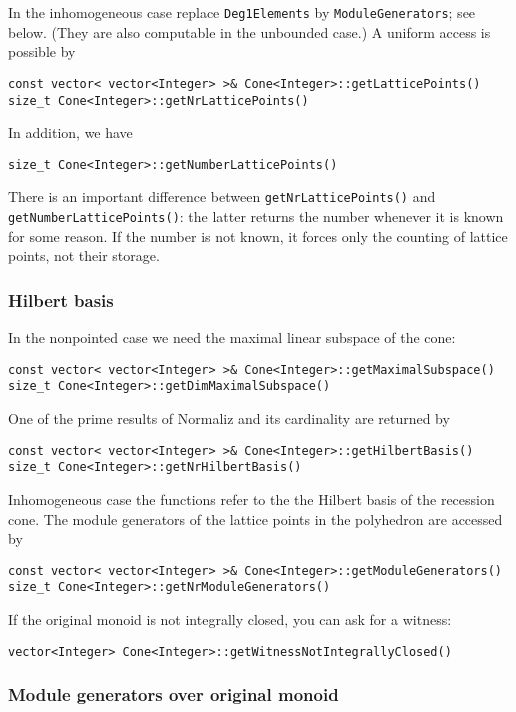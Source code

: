 \begin{small}
In the inhomogeneous case replace \verb|Deg1Elements| by \verb|ModuleGenerators|; see below. (They are also computable in the unbounded case.) A uniform access is possible by
\begin{Verbatim}
const vector< vector<Integer> >& Cone<Integer>::getLatticePoints()
size_t Cone<Integer>::getNrLatticePoints()
\end{Verbatim}

In addition, we have
\begin{Verbatim}
size_t Cone<Integer>::getNumberLatticePoints()
\end{Verbatim}
There is an important difference between \verb|getNrLatticePoints()| and \verb|getNumberLatticePoints()|: the latter returns the number whenever it is known for some reason. If the number is not known, it forces only the counting of lattice points, not their storage.

\subsubsection{Hilbert basis}\label{HB_lib}

In the nonpointed case we need the maximal linear subspace of the cone:
\begin{Verbatim}
const vector< vector<Integer> >& Cone<Integer>::getMaximalSubspace()
size_t Cone<Integer>::getDimMaximalSubspace()
\end{Verbatim}

One of the prime results of Normaliz and its cardinality are returned by
\begin{Verbatim}
const vector< vector<Integer> >& Cone<Integer>::getHilbertBasis()
size_t Cone<Integer>::getNrHilbertBasis()
\end{Verbatim}
Inhomogeneous case the functions refer to the the Hilbert basis of the recession cone. The module generators of the lattice points in the polyhedron are accessed by
\begin{Verbatim}
const vector< vector<Integer> >& Cone<Integer>::getModuleGenerators()
size_t Cone<Integer>::getNrModuleGenerators()
\end{Verbatim}

If the original monoid is not integrally closed, you can ask for a witness:
\begin{Verbatim}
vector<Integer> Cone<Integer>::getWitnessNotIntegrallyClosed()
\end{Verbatim}

\subsubsection{Module generators over original monoid}


\end{small}
